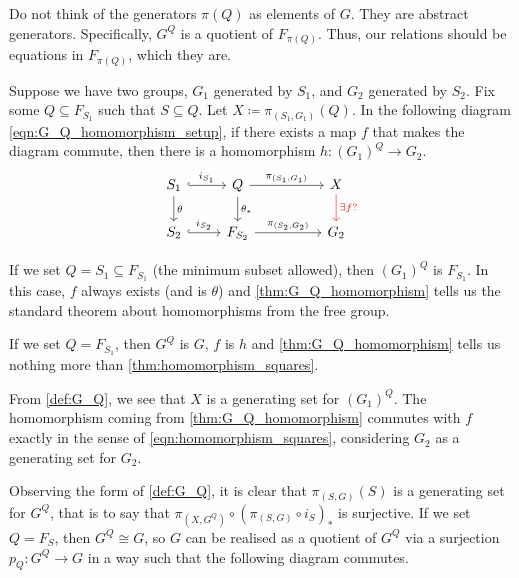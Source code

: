 Do not think of  the generators $\pi(Q)$ as elements of $G$.
They are abstract generators.
Specifically,  $G^Q$ is a quotient of  $F_{\pi(Q)}$.
Thus, our relations should be equations in $F_{\pi(Q)}$, which they are.

\begin{proposition}
	Suppose we have two groups, $G_1$ generated by $S_1$, and $G_2$ generated by $S_2$.
	Fix some $Q \subseteq F_{S_1}$ such that  $S \subseteq Q$.
	Let $X \coloneqq \pi_{(S_1, G_1)}(Q) $.
	In the following diagram \eqref{eqn:G_Q_homomorphism_setup}, if there exists a map $f$ that makes the diagram commute, then there is a homomorphism $h \colon (G_1)^Q \to G_2$.
	\begin{equation}
		\begin{tikzcd}
			S_1 \ar[d, "\theta"] \ar[r, hook, "i_{S_1}"] & Q \ar[d, "\theta_*"] \ar[rr, "\pi_{(S_1,G_1)}"] & & X \ar[d, color=red, "\exists f ?"] \\
			S_2 \ar[r, hook, "i_{S_2}"] & F_{S_2} \ar[rr, "\pi_{(S_2,G_2)}"] & & G_2
		\end{tikzcd}
		\label{eqn:G_Q_homomorphism_setup}
	\end{equation}
	\label{thm:G_Q_homomorphism}
\end{proposition}

\begin{remark}
	If we set $Q = S_1 \subseteq F_{S_1}$ (the minimum subset allowed), then  $(G_1)^Q$ is  $F_{S_1}$.
	In this case, $f$ always exists (and is  $\theta$) and \cref{thm:G_Q_homomorphism} tells us the standard theorem about homomorphisms from the free group.
\end{remark}

\begin{remark}
	If we set $Q = F_{S_1}$, then $G^Q$ is  $G$, $f$ is $h$ and \cref{thm:G_Q_homomorphism} tells us nothing more than  \cref{thm:homomorphism_squares}.
\end{remark}

\begin{remark}
	From \cref{def:G_Q}, we see that  $X$ is a generating set for  $(G_1)^Q$.
	The homomorphism coming from \cref{thm:G_Q_homomorphism} commutes with $f$ exactly in the sense of \eqref{eqn:homomorphism_squares}, considering $G_2$ as a generating set for  $G_2$.
\end{remark}

Observing the form of \cref{def:G_Q}, it is clear that $\pi_{(S,G)}(S)$ is a generating set for $G^Q$, that is to say that $\pi_{(X,G^Q)} \circ \left(\pi_{(S,G)} \circ i_S \right)_*$ is surjective.
If we set $Q=F_S$, then $G^Q \cong G$, so $G$ can be realised as a quotient of $G^Q$ via a surjection $p_Q \colon G^Q \to G$ in a way such that the following diagram commutes.

